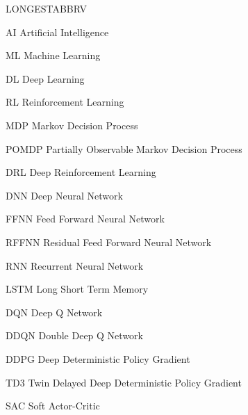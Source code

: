 \begin{theglossary}{LONGESTABBRV}
\item[AI] Artificial Intelligence
\item[ML] Machine Learning
\item[DL] Deep Learning
\item[RL] Reinforcement Learning
\item[MDP] Markov Decision Process
\item[POMDP] Partially Observable Markov Decision Process
\item[DRL] Deep Reinforcement Learning
\item[DNN] Deep Neural Network
\item[FFNN] Feed Forward Neural Network
\item[RFFNN] Residual Feed Forward Neural Network
\item[RNN] Recurrent Neural Network
\item[LSTM] Long Short Term Memory
\item[DQN] Deep Q Network
\item[DDQN] Double Deep Q Network
\item[DDPG] Deep Deterministic Policy Gradient
\item[TD3] Twin Delayed Deep Deterministic Policy Gradient
\item[SAC] Soft Actor-Critic
\end{theglossary}
